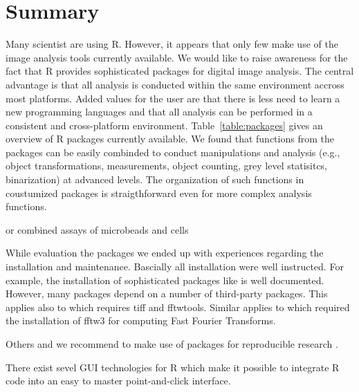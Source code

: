 \section{Summary}

Many scientist are using R. However, it appears that only few make use of the 
image analysis tools currently available. We would like to raise awareness for 
the fact that R provides sophisticated packages for digital image analysis. The 
central advantage is that all analysis is conducted within the same environment 
accross most  platforms. Added values for the user are that there is less need 
to learn a new programming languages and that all analysis can be performed in a 
consistent and cross-platform environment. Table~\ref{table:packages} gives an 
overview of R packages currently available. We found that functions from the 
packages can be easily combinded to conduct manipulations and analysis (e.g., 
object transformations, measurements, object counting, grey level statisitcs, 
binarization) at advanced levels. The organization of such functions in 
coustumized packages is straigthforward even for more complex analysis 
functions.

\citep{rodiger_intestinal_2015} or combined assays of microbeads and cells 
\citep{scholz_second_2015, grossmann_simultaneous_2016}

While evaluation the packages we ended up with experiences regarding the 
installation and maintenance. Bascially all installation were well instructed. 
For example, the installation of sophisticated packages like  is 
well documented. However, many packages depend on a number of third-party 
packages. This applies also to  which requires tiff and 
fftwtools. Similar applies to  which required the installation 
of fftw3 for computing Fast Fourier Transforms.

Others and we recommend to make use of packages for reproducible research 
\citep{rodiger_r_2015}. 

There exist sevel GUI technologies for R which make it possible to integrate 
R code into an easy to master point-and-click interface.


